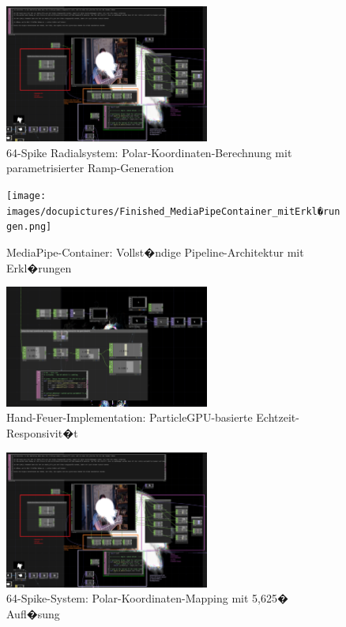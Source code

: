\begin{figure}[!htbp]
    \centering
    \includegraphics[width=0.6\textwidth,height=0.25\textheight,keepaspectratio]{images/docupictures/TopDown_KreisZuRampsParametisierteBerechnungen.png}
    \caption{64-Spike Radialsystem: Polar-Koordinaten-Berechnung mit parametrisierter Ramp-Generation}
    \label{fig:radial_spike_system}
\end{figure}

\begin{figure}[!htbp]
    \centering
    \texttt{[image: images/docupictures/Finished\_MediaPipeContainer\_mitErkl�rungen.png]}
    \caption{MediaPipe-Container: Vollst�ndige Pipeline-Architektur mit Erkl�rungen}
    \label{fig:mediapipe_architecture}
\end{figure}

\begin{figure}[!htbp]
    \centering
    \includegraphics[width=0.6\textwidth,height=0.25\textheight,keepaspectratio]{images/docupictures/NoisyBlob_HEAD_to_ParticleGPU_Translate.png}
    \caption{Hand-Feuer-Implementation: ParticleGPU-basierte Echtzeit-Responsivit�t}
    \label{fig:hand_fire_system}
\end{figure}

\begin{figure}[!htbp]
    \centering
    \includegraphics[width=0.6\textwidth,height=0.25\textheight,keepaspectratio]{images/docupictures/TopDown_KreisZuRampsParametisierteBerechnungen.png}
    \caption{64-Spike-System: Polar-Koordinaten-Mapping mit 5,625� Aufl�sung}
    \label{fig:spike_system_production}
\end{figure}

